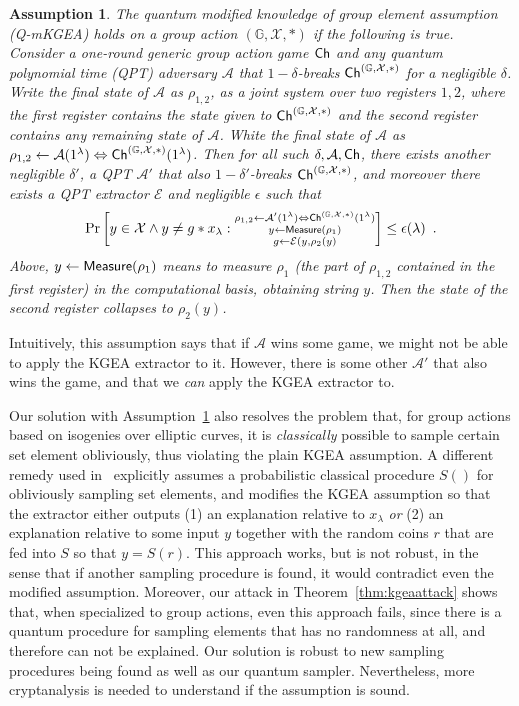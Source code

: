 \documentclass{article}\usepackage[a4paper,margin=20mm]{geometry}
\newtheorem{assumption}[theorem]{Assumption}
\numberwithin{theorem}{section}
\numberwithin{equation}{section}
\newcommand{\G}{\mathbb{G}}
\newcommand{\As}{{\mathcal{A}}}
\newcommand{\Es}{{\mathcal{E}}}
\newcommand{\Xs}{{\mathcal{X}}}
\begin{document}
\begin{assumption}\label{def:qmkgea} The \emph{quantum modified knowledge of group element assumption} (Q-mKGEA) holds on a group action $(\G,\Xs,*)$ if the following is true. Consider a one-round generic group action game ${\sf Ch}$ and any quantum polynomial time (QPT) adversary $\As$ that $1-\delta$-breaks ${\sf Ch}^{(\G,\Xs,*)}$ for a negligible $\delta$. Write the final state of $\As$ as $\rho_{1,2}$, as a joint system over two registers $1,2$, where the first register contains the state given to ${\sf Ch}^{(\G,\Xs,*)}$ and the second register contains any remaining state of $\As$. White the final state of $\As$ as $\rho_{1,2}\gets\As(1^\lambda)\Leftrightarrow {\sf Ch}^{(\G,\Xs,*)}(1^\lambda)$. Then for all such $\delta,\As,{\sf Ch}$, there exists another  negligible $\delta'$, a QPT $\As'$ that also $1-\delta'$-breaks ${\sf Ch}^{(\G,\Xs,*)}$, and moreover there exists a QPT extractor $\Es$ and negligible $\epsilon$ such that 
	\[\Pr\left[y\in\Xs\wedge y\neq g*x_\lambda:\substack{\rho_{1,2}\gets\As'(1^\lambda)\Leftrightarrow {\sf Ch}^{(\G,\Xs,*)}(1^\lambda)\\y\gets{\sf Measure}(\rho_1)\\g\gets\Es(y,\rho_2(y)}\right]\leq\epsilon(\lambda)\enspace .\]
	Above, $y\gets{\sf Measure}(\rho_1)$ means to measure $\rho_1$ (the part of $\rho_{1,2}$ contained in the first register) in the computational basis, obtaining string $y$. Then the state of the second register collapses to $\rho_2(y)$.
\end{assumption}

Intuitively, this assumption says that if $\As$ wins some game, we might not be able to apply the KGEA extractor to it. However, there is some other $\As'$ that also wins the game, and that we \emph{can} apply the KGEA extractor to. 


\begin{remark}Our solution with Assumption~\ref{def:qmkgea} also resolves the problem that, for group actions based on isogenies over elliptic curves, it is \emph{classically} possible to sample certain set element obliviously, thus violating the plain KGEA assumption. A different remedy used in~\cite{EC:LiuMonZha23} explicitly assumes a probabilistic classical procedure $S()$ for obliviously sampling set elements, and modifies the KGEA assumption so that the extractor either outputs (1) an explanation relative to $x_\lambda$ \emph{or} (2) an explanation relative to some input $y$ together with the random coins $r$ that are fed into $S$ so that $y=S(r)$. This approach works, but is not robust, in the sense that if another sampling procedure is found, it would contradict even the modified assumption. Moreover, our attack in Theorem~\ref{thm:kgeaattack} shows that, when specialized to group actions, even this approach fails, since there is a quantum procedure for sampling elements that has no randomness at all, and therefore can not be explained. Our solution is robust to new sampling procedures being found as well as our quantum sampler. Nevertheless, more cryptanalysis is needed to understand if the assumption is sound.
\end{remark}
\end{document}
